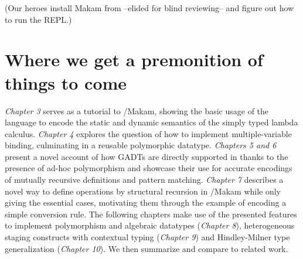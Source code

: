 \begin{scenecomment}
(Our heroes install Makam from --elided for blind reviewing-- and figure out how to run the REPL.)
\end{scenecomment}

\section{Where we get a premonition of things to
come}\label{where-we-get-a-premonition-of-things-to-come}

\identNormal

\emph{Chapter 3} serves as a tutorial to \lamprolog/Makam, showing the
basic usage of the language to encode the static and dynamic semantics
of the simply typed lambda calculus. \emph{Chapter 4} explores the
question of how to implement multiple-variable binding, culminating in a
reusable polymorphic datatype. \emph{Chapters 5 and 6} present a novel
account of how GADTs are directly supported in \lamprolog thanks to the
presence of ad-hoc polymorphism and showcase their use for accurate
encodings of mutually recursive definitions and pattern matching.
\emph{Chapter 7} describes a novel way to define operations by
structural recursion in \lamprolog/Makam while only giving the essential
cases, motivating them through the example of encoding a simple
conversion rule. The following chapters make use of the presented
features to implement polymorphism and algebraic datatypes
(\emph{Chapter 8}), heterogeneous staging constructs with contextual
typing (\emph{Chapter 9}) and Hindley-Milner type generalization
(\emph{Chapter 10}). We then summarize and compare to related work.

\identDialog
